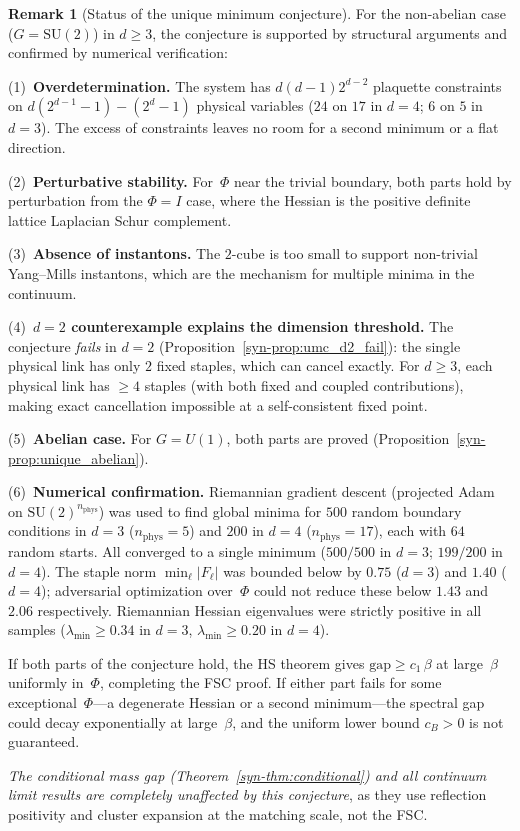 \documentclass[11pt]{article}
\theoremstyle{definition}
\newtheorem{remark}[theorem]{Remark}
\newcommand{\SU}{\mathrm{SU}}
\newcommand{\gap}{\mathrm{gap}}
\begin{document}
\begin{remark}[Status of the unique minimum conjecture]
\label{syn-rem:umc}
For the non-abelian case ($G = \SU(2)$) in $d \geq 3$,
the conjecture is supported by structural arguments
and confirmed by numerical verification:

\textup{(1)}~\textbf{Overdetermination.}
The system has $d(d{-}1)2^{d-2}$
plaquette constraints on $d(2^{d-1} - 1) - (2^d - 1)$
physical variables
($24$ on $17$ in $d = 4$; $6$ on $5$ in $d = 3$).
The excess of constraints leaves no room for a second
minimum or a flat direction.

\textup{(2)}~\textbf{Perturbative stability.}
For~$\Phi$ near the trivial boundary,
both parts hold by perturbation from the $\Phi = I$ case,
where the Hessian is the positive definite lattice
Laplacian Schur complement.

\textup{(3)}~\textbf{Absence of instantons.}
The $2$-cube is too small to support
non-trivial Yang--Mills instantons, which are the
mechanism for multiple minima in the continuum.

\textup{(4)}~\textbf{$d = 2$ counterexample explains the
dimension threshold.}
The conjecture \emph{fails} in $d = 2$
(Proposition~\ref{syn-prop:umc_d2_fail}): the single physical
link has only $2$ fixed staples, which can cancel exactly.
For $d \geq 3$, each physical link has $\geq 4$ staples
(with both fixed and coupled contributions), making
exact cancellation impossible at a self-consistent
fixed point.

\textup{(5)}~\textbf{Abelian case.}
For $G = U(1)$, both parts
are proved (Proposition~\ref{syn-prop:unique_abelian}).

\textup{(6)}~\textbf{Numerical confirmation.}
Riemannian gradient descent (projected Adam on
$\SU(2)^{n_{\mathrm{phys}}}$) was used to find global
minima for $500$ random boundary conditions in $d = 3$
($n_{\mathrm{phys}} = 5$) and $200$ in $d = 4$
($n_{\mathrm{phys}} = 17$), each with $64$ random starts.
All converged to a single minimum
($500/500$ in $d = 3$; $199/200$ in $d = 4$).
The staple norm $\min_\ell |F_\ell|$ was bounded below by
$0.75$ ($d = 3$) and $1.40$ ($d = 4$); adversarial
optimization over~$\Phi$ could not reduce these below
$1.43$ and $2.06$ respectively.
Riemannian Hessian eigenvalues were strictly positive in
all samples ($\lambda_{\min} \geq 0.34$ in $d = 3$,
$\lambda_{\min} \geq 0.20$ in $d = 4$).

If both parts of the conjecture hold, the HS theorem gives
$\gap \geq c_1\,\beta$ at large~$\beta$
uniformly in~$\Phi$, completing the FSC proof.
If either part fails for some exceptional~$\Phi$---a
degenerate Hessian or a second minimum---the
spectral gap could decay exponentially at
large~$\beta$, and the uniform lower bound $c_B > 0$
is not guaranteed.

\emph{The conditional mass gap
\textup{(}Theorem~\ref{syn-thm:conditional}\textup{)} and all
continuum limit results are completely unaffected by
this conjecture}, as they use reflection positivity and
cluster expansion at the matching scale, not the FSC.
\end{remark}
\end{document}
